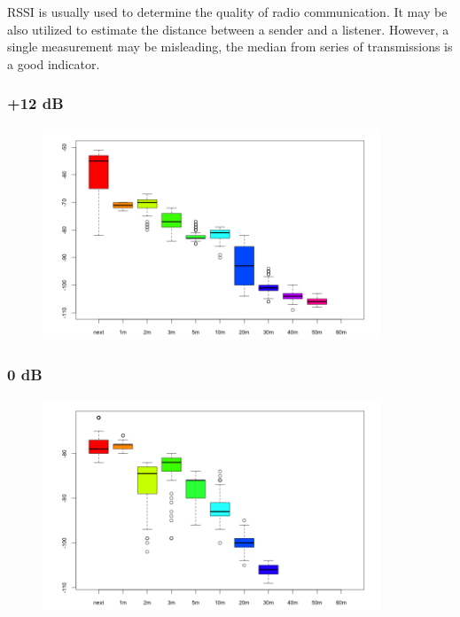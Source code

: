 RSSI is usually used to determine the quality of radio communication.
It may be also utilized to estimate the distance between a sender and a listener.
However, a single measurement may be misleading, the median from series of transmissions is a good indicator.


\subsubsection{+12 dB}

\begin{figure}[H]
  \centering
  \includegraphics[width=0.9\textwidth]{img/tests/rssi/db_12.png}
\end{figure}


\subsubsection{0 dB}

\begin{figure}[H]
  \centering
  \includegraphics[width=0.9\textwidth]{img/tests/rssi/db_00.png}
\end{figure}

